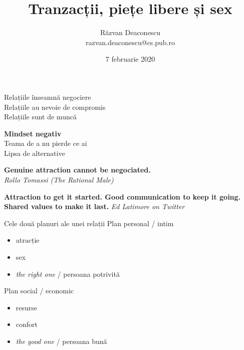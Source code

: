 \documentclass{simple}
\title[Tranzacții, piețe libere și sex]{Tranzacții, piețe libere și sex}
\institute{Unicorns, Fairies, Retards and Assholes Trip}
\author[Răzvan Deaconescu]{Răzvan Deaconescu \\
razvan.deaconescu@cs.pub.ro}
\date{7 februarie 2020}
\begin{document}
\frame{\titlepage}

\begin{frame}{}
  \centering
  \pause
  \vspace{0.5cm}
  \Large{Relațiile înseamnă negociere} \\
  \pause
  \vspace{0.5cm}
  \Large{Relațiile au nevoie de compromis} \\
  \pause
  \vspace{0.5cm}
  \Large{Relațiile sunt de muncă}
\end{frame}

\begin{frame}{}
  \centering
  \pause
  \vspace{0.5cm}
  \Large{\textbf{Mindset negativ}} \\
  \pause
  \vspace{0.5cm}
  \Large{Teama de a nu pierde ce ai} \\
  \pause
  \vspace{0.5cm}
  \Large{Lipsa de alternative}
\end{frame}

\begin{frame}{}
  \centering
  \vspace{0.5cm}
  \Large{\textbf{Genuine attraction cannot be negociated.}} \\
  \vspace{3mm}
  \hfill \textit{Rollo Tomassi (The Rational Male)}
\end{frame}

\begin{frame}{}
  \centering
  \vspace{0.5cm}
  \Large{\textbf{Attraction to get it started. Good communication to keep it going. Shared values to make it last.}}
  \vspace{3mm}
  \hfill \textit{Ed Latimore on Twitter}
\end{frame}

\begin{frame}{Cele două planuri ale unei relații}
  \pause
  \Large{Plan personal / intim}
    \begin{itemize}
      \pause
      \item atracție
      \pause
      \item sex
      \pause
      \item \textit{the right one} / persoana potrivită
    \end{itemize}
  \pause
  \Large{Plan social / economic}
    \begin{itemize}
      \pause
      \item resurse
      \pause
      \item confort
      \pause
      \item \textit{the good one} / persoana bună
    \end{itemize}
\end{frame}
\end{document}
